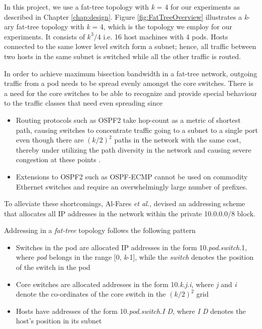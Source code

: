 In this project, we use a fat-tree topology with \textit{k} = 4 for our experiments as described in Chapter \ref{chap:design}. Figure \ref{fig:FatTreeOverview} illustrates a \textit{k}-ary fat-tree topology with \textit{k} = 4, which is the topology we  employ for our experiments. It consists of $\textit{k}^3/4$ i.e. 16 host machines with 4 pods. Hosts connected to the same lower level switch form a subnet; hence, all traffic between two hosts in the same subnet is switched while all the other traffic is routed.

In order to achieve maximum bisection bandwidth in a fat-tree network, outgoing traffic from a pod needs to be spread evenly amongst the core switches. There is a need for the core switches to be able to recognize and provide special behaviour to the traffic classes that need even spreading since  

\begin{itemize}

\item Routing protocols such as OSPF2 \cite{moy1998open} take hop-count as a metric of shortest path, causing switches to concentrate traffic going to a subnet to a single port even though there are $(\textit{k}/2)^2$ paths in the network with the same cost, thereby under utilizing the path diversity in the network and causing severe congestion at these points \cite{al2008scalable}.

\item Extensions to OSPF2 such as OSPF-ECMP \cite{thaler2000multipath} cannot be used on commodity Ethernet switches and require an overwhelmingly large number of prefixes.
 \end{itemize}

To alleviate these shortcomings, Al-Fares \textit{et al.}, devised an addressing scheme that allocates all IP addresses in the network within the private 10.0.0.0/8 block. 

Addressing in a \textit{fat-tree} topology follows the following pattern 

\begin{itemize}
	\item Switches in the pod are allocated IP addresses in the form 10.\textit{pod}.\textit{switch}.1, where \textit{pod} belongs in the range [0, \textit{k}-1], while the \textit{switch} denotes the position of the switch in the pod
	
	\item Core switches are allocated addresses in the form 10.\textit{k}.\textit{j}.\textit{i}, where \textit{j} and \textit{i} denote the co-ordinates of the core switch in the $(\textit{k}/2)^2$ grid 
	
	\item Hosts have addresses of the form 10.\textit{pod}.\textit{switch}.\textit{I D}, where \textit{I D} denotes the host's position in its subnet 
\end{itemize}

